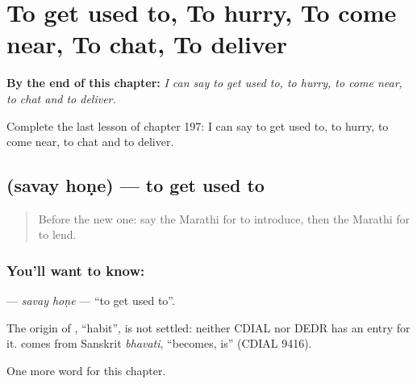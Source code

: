 
\chapter{To get used to, To hurry, To come near, To chat, To deliver}
\label{ch:mr-to-get-used-to-to-hurry-to-come-near-to-chat-to-deliver}

\begin{chapteropening}
\textbf{By the end of this chapter:} \emph{I can say to get used to, to hurry, to come near, to chat and to deliver.}

Complete the last lesson of chapter 197: I can say to get used to, to hurry, to come near, to chat and to deliver.
\end{chapteropening}

\section[\texorpdfstring{\mr{सवय} \mr{होणे} (savay hoṇe)}{सवय होणे (savay hoṇe)}]{  (savay hoṇe) — to get used to}

\label{lesson:MR-C197-savay-hone}



\begin{quote}
Before the new one: say the Marathi for to introduce, then the Marathi for to lend.
\end{quote}

\subsection*{You'll want to know:  }
\textbf{ } — \emph{savay hoṇe} — \textquotedblleft{}to get used to\textquotedblright{}.

\begin{cousinweb}
The origin of \textbf{}, \textquotedblleft{}habit\textquotedblright{}, is not settled: neither CDIAL nor DEDR has an entry for it. \textbf{} comes from Sanskrit \emph{bhavati}, \textquotedblleft{}becomes, is\textquotedblright{} (CDIAL 9416).
\end{cousinweb}

\begin{grammarlens}[title={What you've built}]
One more word for this chapter.
\end{grammarlens}

